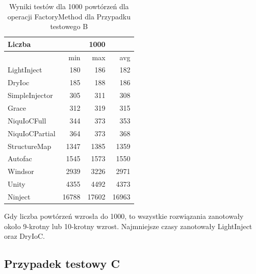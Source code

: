 \documentclass[12pt]{article}
\begin{document}
\begin{table}[H]
\captionsetup{belowskip=0pt,aboveskip=0pt}
\begin{center}
\begin{small}
	\begin{tabular}{ | l | r r r | }
    		\hline
Liczba & & 1000 & \\ \hline
 & min & max & avg \\ \hline
LightInject & 180 & 186 & 182 \\ \hline
DryIoc & 185 & 188 & 186 \\ \hline
SimpleInjector & 305 & 311 & 308 \\ \hline
Grace & 312 & 319 & 315 \\ \hline
NiquIoCFull & 344 & 373 & 353 \\ \hline
NiquIoCPartial & 364 & 373 & 368 \\ \hline
StructureMap & 1347 & 1385 & 1359 \\ \hline
Autofac & 1545 & 1573 & 1550 \\ \hline
Windsor & 2939 & 3226 & 2971 \\ \hline
Unity & 4355 & 4492 & 4373 \\ \hline
Ninject & 16788 & 17602 & 16963 \\ \hline
  	\end{tabular}
\end{small}
\end{center}
\caption{Wyniki testów dla 1000 powtórzeń dla operacji FactoryMethod dla Przypadku testowego B}
\label{TestCaseB_FactoryMethod1000}
\end{table}
Gdy liczba powtórzeń wzrosła do 1000, to wszystkie rozwiązania zanotowały około 9-krotny lub 10-krotny wzrost. Najmniejsze czasy zanotowały LightInject oraz DryIoC.


\subsection{Przypadek testowy C}
\end{document}
